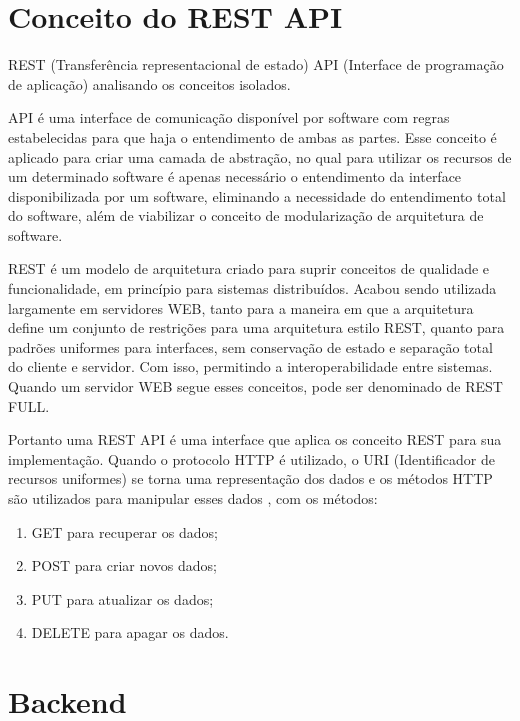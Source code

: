 \documentclass[../../layout.tex]{subfiles}
\begin{document}
\section{Conceito do REST API}
\hspace*{3em}REST (Transferência representacional de estado) API (Interface de programação de aplicação) analisando os conceitos isolados.\par
API é uma interface de comunicação  disponível por software com regras estabelecidas para que haja o entendimento de ambas as partes. Esse conceito é aplicado para criar uma camada de abstração, no qual para utilizar os recursos de um determinado software é apenas necessário o entendimento da interface disponibilizada por um software, eliminando a  necessidade do entendimento total do software, além de viabilizar o conceito de modularização de arquitetura de software. \cite{16} \par 
REST é um modelo de arquitetura criado para suprir conceitos de qualidade e funcionalidade, em princípio para sistemas distribuídos. Acabou sendo utilizada largamente em servidores WEB, tanto para a maneira em que a arquitetura define um conjunto de restrições para uma arquitetura estilo REST, quanto para padrões uniformes para interfaces, sem conservação de estado e separação total do cliente e servidor. Com isso, permitindo a interoperabilidade entre sistemas. Quando um servidor WEB segue esses conceitos, pode ser denominado de REST FULL.\par

Portanto uma REST API é uma interface que aplica os conceito REST para sua implementação\cite{19}. Quando o protocolo HTTP é utilizado, o URI (Identificador de recursos uniformes) se torna uma representação dos dados e os métodos HTTP são utilizados para manipular esses dados \cite{16}, com os métodos:

\begin{enumerate}[label=\alph*)]
\itemsep0em
    \item GET para recuperar os dados;
    \item POST para criar novos dados;
    \item PUT para atualizar os dados;
    \item DELETE para apagar os dados.
\end{enumerate}

\section{Backend}
\end{document}
